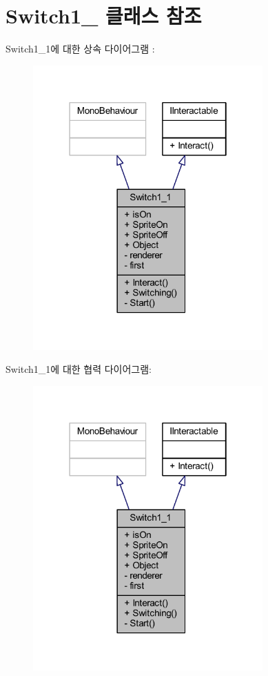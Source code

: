 \hypertarget{class_switch1__1}{}\section{Switch1\+\_ 클래스 참조}
\label{class_switch1__1}


Switch1\+\_\+1에 대한 상속 다이어그램 \+: \nopagebreak
\begin{figure}[H]
\begin{center}
\leavevmode
\includegraphics[width=250pt]{dd/dbb/class_switch1__1__inherit__graph}
\end{center}
\end{figure}


Switch1\+\_\+1에 대한 협력 다이어그램\+:\nopagebreak
\begin{figure}[H]
\begin{center}
\leavevmode
\includegraphics[width=250pt]{d9/d53/class_switch1__1__coll__graph}
\end{center}
\end{figure}
